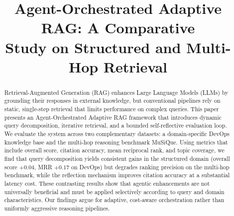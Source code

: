 \documentclass[conference]{IEEEtran}
\begin{document}
\title{Agent-Orchestrated Adaptive RAG: A Comparative\\ Study on Structured and Multi-Hop Retrieval}

\author{
\and
{}
\and
{}
}

\maketitle

\begin{abstract}
Retrieval-Augmented Generation (RAG) enhances Large Language Models (LLMs) by grounding their responses in external knowledge, but conventional pipelines rely on static, single-step retrieval that limits performance on complex queries. This paper presents an Agent-Orchestrated Adaptive RAG framework that introduces dynamic query decomposition, iterative retrieval, and a bounded self-reflective evaluation loop. We evaluate the system across two complementary datasets: a domain-specific DevOps knowledge base and the multi-hop reasoning benchmark MuSiQue. Using metrics that include overall score, citation accuracy, mean reciprocal rank, and topic coverage, we find that query decomposition yields consistent gains in the structured domain (overall score $+0.04$, MRR $+0.17$ on DevOps) but degrades ranking precision on the multi-hop benchmark, while the reflection mechanism improves citation accuracy at a substantial latency cost. These contrasting results show that agentic enhancements are not universally beneficial and must be applied selectively according to query and domain characteristics. Our findings argue for adaptive, cost-aware orchestration rather than uniformly aggressive reasoning pipelines.
\end{abstract}
\end{document}
